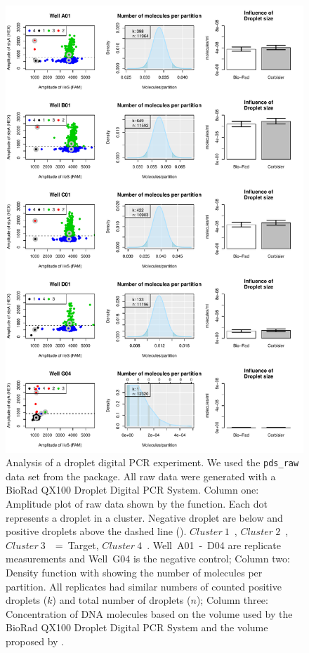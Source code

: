 \begin{figure}[htbp]
\centering
  \includegraphics[clip=true, width=14cm]{figures/dpcR_bioamp.pdf}
    \caption{Analysis of a droplet digital PCR experiment. We used the 
\texttt{pds\_raw} data set from the  package. All raw data were 
generated with a BioRad QX100 Droplet Digital PCR System. Column one: Amplitude 
plot of raw data shown by the  function. Each dot represents a 
droplet in a cluster. Negative droplet are below and positive droplets above the 
dashed line ({\textbf{\textendash\textendash}}). 
$Cluster~1$~\textcolor{black}{\textbf{\textbullet}}, 
$Cluster~2$~\textcolor{red}{\textbf{\textbullet}}, 
$Cluster~3$~\textcolor{green}{\textbf{\textbullet}}~=~Target, 
$Cluster~4$~\textcolor{blue}{\textbf{\textbullet}}. Well~A01~-~D04 are replicate 
measurements and Well~G04 is the negative control; Column two: Density function 
with showing the number of molecules per partition. All replicates had similar 
numbers of counted positive droplets ($k$) and total number of droplets ($n$); 
Column three: Concentration of DNA molecules based on the volume used by the 
BioRad QX100 Droplet Digital PCR System and the volume proposed by 
\citet{corbisier_2015}. 
    }  \label{figure:dpcR_bioamp}
\end{figure}

